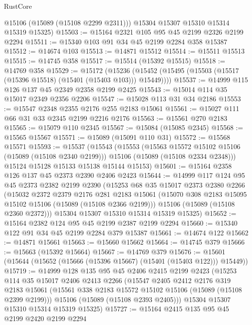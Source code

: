 \begin{lexlean}{RustCore}
\begin{coremodule}
        @15106
        (@15089 (@15108 @2299 @2311)))
      @15304
      @15307
      @15310
      @15314
      @15319
      @15325)
@15503 := @15164 @2321 @105 @95 @45 @2199 @2326 @2199 @2294
@15511 := @15340 @103 @91 @34 @45 @2199 @2284 @358 @15387
@15512 := @14674 @103
@15513 := @14871 @15512
@15514 := @15511 @15513
@15515 := @14745 @358
@15517 := @15514 (@15392 @15515)
@15518 := @14769 @358
@15529 := @15172
    (@15236 (@15452 (@15495 (@15503 (@15517 (@15396 @15518) (@15401 (@15403 @103))) @15449))))
@15537 := @14999 @115 @126 @137 @45 @2349 @2358 @2199 @2425
@15543 := @15014 @114 @35 @15017 @2349 @2356 @2206
@15547 := @15028 @113 @31 @34 @2186
@15553 := @15547 @2348 @2355 @2176 @255 @2183 @15061
@15561 := @15027 @111 @66 @31 @33 @2345 @2199 @2216 @2176
@15563 := @15561 @270 @2183
@15565 := @15079 @110 @2345
@15567 := @15084 (@15085 @2345)
@15568 := @15565 @15567
@15571 := @15089 (@15091 @110 @31)
@15572 := @15568 @15571
@15593 := @15537
    (@15543
      (@15553
        (@15563 @15572 @15102 @15106 (@15089 (@15108 @2340 @2199)))
        @15106
        (@15089 (@15108 @2334 @2348)))
      @15124
      @15128
      @15133
      @15138
      @15144
      @15153)
@15601 := @15164 @2358 @126 @137 @45 @2373 @2390 @2406 @2423
@15644 := @14999
    @117
    @124
    @95
    @45
    @2373
    @2382
    @2199
    @2390
    (@15253
      @68
      @35
      @15017
      @2373
      @2380
      @2266
      (@15032
        @2372
        @2379
        @2176
        @281
        @2183
        @15061
        (@15070 @308 @2183 @15095 @15102 @15106 (@15089 (@15108 @2366 @2199)))
        @15106
        (@15089 (@15108 @2360 @2372)))
      @15304
      @15307
      @15310
      @15314
      @15319
      @15325)
@15652 := @15164 @2382 @124 @95 @45 @2199 @2387 @2199 @2294
@15660 := @15340 @122 @91 @34 @45 @2199 @2284 @379 @15387
@15661 := @14674 @122
@15662 := @14871 @15661
@15663 := @15660 @15662
@15664 := @14745 @379
@15666 := @15663 (@15392 @15664)
@15667 := @14769 @379
@15676 := @15601 (@15644 (@15652 (@15666 (@15396 @15667) (@15401 (@15403 @122))) @15449))
@15719 := @14999
    @128
    @135
    @95
    @45
    @2406
    @2415
    @2199
    @2423
    (@15253
      @114
      @35
      @15017
      @2406
      @2413
      @2266
      (@15547
        @2405
        @2412
        @2176
        @319
        @2183
        @15061
        (@15561 @338 @2183 @15572 @15102 @15106 (@15089 (@15108 @2399 @2199)))
        @15106
        (@15089 (@15108 @2393 @2405)))
      @15304
      @15307
      @15310
      @15314
      @15319
      @15325)
@15727 := @15164 @2415 @135 @95 @45 @2199 @2420 @2199 @2294

\end{coremodule}
\end{lexlean}
